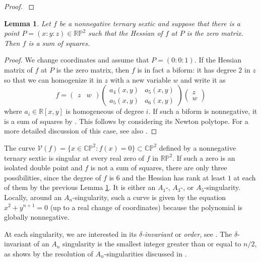 \documentclass[a4paper]{article}
\numberwithin{equation}{section}
\newcommand{\R}{\mathbb{R}}
\newcommand{\C}{\mathbb{C}}
\renewcommand{\P}{\mathbb{P}}
\newcommand{\V}{\mathcal{V}}
\newtheorem{lemma}[theorem]{Lemma}
\theoremstyle{definition}
\theoremstyle{remark}
\begin{document}
\begin{proof}
\cite[Lem. 3.1 and Prop. 3.2]{clrzbMATH03645183}
\end{proof}

\begin{lemma}\label{lem:HessianSOS}
Let $f$ be a nonnegative ternary sextic and suppose that there is a point $P = (x:y:z)\in \R\P^2$ such that the Hessian of $f$ at $P$ is the zero matrix. Then $f$ is a sum of squares. 
\end{lemma}

\begin{proof}
We change coordinates and assume that $P = (0:0:1)$. If the Hessian matrix of $f$ at $P$ is the zero matrix, then $f$ is in fact a biform: it has degree $2$ in $z$ so that we can homogenize it in $z$ with a new variable $w$ and write it as
\[ f = 
\begin{pmatrix} z & w\end{pmatrix} 
\begin{pmatrix}
a_4 (x,y) & a_5(x,y) \\
a_5 (x,y) & a_6(x,y)
\end{pmatrix} 
\begin{pmatrix}
z \\ w
\end{pmatrix}
\]
where $a_i\in\R[x,y]$ is homogeneous of degree $i$. If such a biform is nonnegative, it is a sum of squares by \cite[Thm. 1.1]{GGMzbMATH06572970}. This follows by considering its Newton polytope. For a more detailed discussion of this case, see also \cite[Sec. 3]{zbMATH07102076}.
\end{proof}

The curve $\V(f) = \{x\in \C\P^2\colon f(x) = 0\}\subset \C\P^2$ defined by a nonnegative ternary sextic is singular at every real zero of $f$ in $\R\P^2$. 
If such a zero is an isolated double point and $f$ is not a sum of squares, there are only three possibilities, since the degree of $f$ is $6$ and the Hessian has rank at least $1$ at each of them by the previous Lemma \ref{lem:HessianSOS}. It is either an $A_1$-, $A_3$-, or $A_5$-singularity. Locally, around an $A_n$-singularity, such a curve is given by the equation $x^2 + y^{n+1} = 0$ (up to a real change of coordinates) because the polynomial is globally nonnegative. 

At each singularity, we are interested in its \emph{$\delta$-invariant} or \emph{order}, see \cite[Sec. 3.11]{CasasAlverozbMATH01497487}. The $\delta$-invariant of an $A_n$ singularity is the smallest integer greater than or equal to $n/2$, as \cite[Thm. 3.11.12]{CasasAlverozbMATH01497487} shows by the resolution of $A_n$-singularities discussed in \cite[Sec. 4.3]{Hartshorne}.
\end{document}
